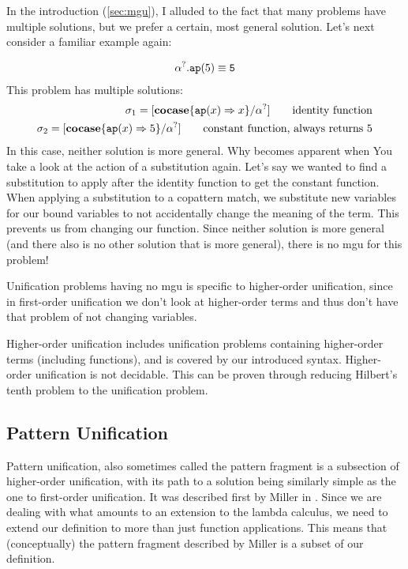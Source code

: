 \documentclass[twoside,12pt,a4paper]{article}
\begin{document}
In the introduction (\ref{sec:mgu}), I alluded to the fact that many problems have multiple solutions, but we prefer a certain, most general solution.
Let's next consider a familiar example again:
\begin{example}
    \begin{align*}
        \alpha^?.\texttt{ap}(5) \equiv \texttt{5}
    \end{align*}
    This problem has multiple solutions:
    \begin{align*}
        \sigma_1 = [\textbf{cocase}\{\texttt{ap}(x)\Rightarrow x\} / \alpha^?]\tag*{identity function}\\
        \sigma_2 = [\textbf{cocase}\{\texttt{ap}(x)\Rightarrow 5\} / \alpha^?]\tag*{constant function, always returns 5}
    \end{align*}
    In this case, neither solution is more general. Why becomes apparent when You take a look at the action of a substitution again. 
Let's say we wanted to find a substitution to apply after the identity function to get the constant function. 
When applying a substitution to a copattern match, we substitute new variables for our bound variables to not accidentally change the meaning of the term.
This prevents us from changing our function. 
Since neither solution is more general (and there also is no other solution that is more general),
there is no mgu for this problem!
\end{example}

Unification problems having no mgu is specific to higher-order unification, since in first-order unification we don't look at 
higher-order terms and thus don't have that problem of not changing variables.

\begin{theorem}
    Higher-order unification includes unification problems containing higher-order terms (including functions),
    and is covered by our introduced syntax. 
    Higher-order unification is not decidable. This can be proven through reducing Hilbert's tenth problem to the unification problem.%
\end{theorem} %

\subsection{Pattern Unification}

Pattern unification, also sometimes called the pattern fragment
is a subsection of higher-order unification, with its path to a solution being similarly simple as the one to first-order unification.
It was described first by Miller in \cite{10.1093/logcom/1.4.497}.
Since we are dealing with what amounts to an extension to the lambda calculus, we need to extend our definition to more than just function applications. 
This means that (conceptually) the pattern fragment described by Miller is a subset of our definition.
\end{document}
